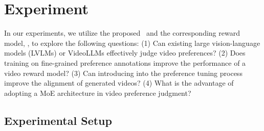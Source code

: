 \section{Experiment}
In our experiments, we utilize the proposed \datasetname\ and the corresponding reward model, \algname, to explore the following questions: (1) Can existing large vision-language models (LVLMs) or VideoLLMs effectively judge video preferences? (2) Does training on fine-grained preference annotations improve the performance of a video reward model? (3) Can introducing \algname into the preference tuning process improve the alignment of generated videos? (4) What is the advantage of adopting a MoE architecture in video preference judgment? 

\subsection{Experimental Setup}

